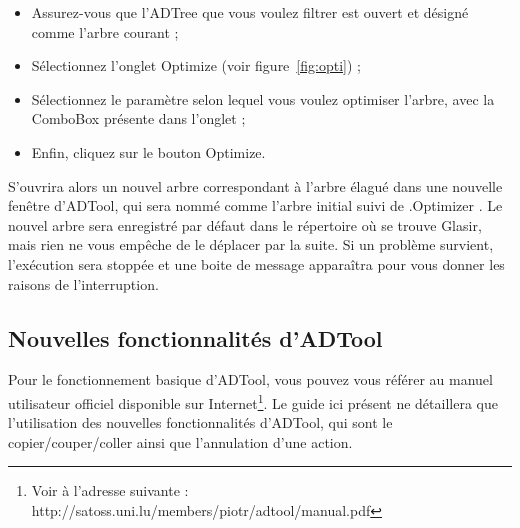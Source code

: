 \begin{itemize}
\item Assurez-vous que l'ADTree que vous voulez filtrer est ouvert et désigné comme l'arbre courant ;
\item Sélectionnez l'onglet \og Optimize \fg{} (voir {\sc figure}~\ref{fig:opti}) ;
\item Sélectionnez le paramètre selon lequel vous voulez optimiser l'arbre, avec la ComboBox présente dans l'onglet ;
\item Enfin, cliquez sur le bouton \og Optimize\fg{}.
\end{itemize}

S'ouvrira alors un nouvel arbre correspondant à l'arbre élagué dans une nouvelle fenêtre d'ADTool, qui sera nommé comme l'arbre initial suivi de \og .Optimizer \fg{}. Le nouvel arbre sera enregistré par défaut dans le répertoire où se trouve Glasir, mais rien ne vous empêche de le déplacer par la suite.
Si un problème survient, l'exécution sera stoppée et une boite de message apparaîtra pour vous donner les raisons de l'interruption.


\subsection{Nouvelles fonctionnalités d'ADTool}
\label{ssec:manuelADTool}

Pour le fonctionnement basique d'ADTool, vous pouvez vous référer au manuel utilisateur officiel
 disponible sur Internet\footnote{Voir à l'adresse suivante : http://satoss.uni.lu/members/piotr/adtool/manual.pdf}. Le guide ici présent ne détaillera que l'utilisation des nouvelles fonctionnalités d'ADTool, qui sont le copier/couper/coller ainsi que l'annulation d'une action.

